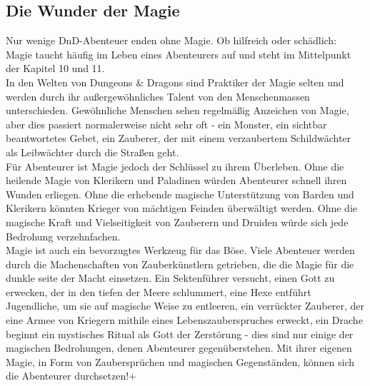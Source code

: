 \subsection{Die Wunder der Magie}
Nur wenige DnD-Abenteuer enden ohne Magie. Ob hilfreich oder schädlich: Magie taucht häufig im Leben eines Abenteurers auf und steht im Mittelpunkt der Kapitel 10 und 11.\\
In den Welten von Dungeons & Dragons sind Praktiker der Magie selten und werden durch ihr außergewöhnliches Talent von den Menschenmassen unterschieden. Gewöhnliche Menschen sehen regelmäßig Anzeichen von Magie, aber dies passiert normalerweise nicht sehr oft - ein Monster, ein sichtbar beantwortetes Gebet, ein Zauberer, der mit einem verzaubertem Schildwächter als Leibwächter durch die Straßen geht.\\
Für Abenteurer ist Magie jedoch der Schlüssel zu ihrem Überleben. Ohne die heilende Magie von Klerikern und Paladinen würden Abenteurer schnell ihren Wunden erliegen. Ohne die erhebende magische Unterstützung von Barden und Klerikern könnten Krieger von mächtigen Feinden überwältigt werden. Ohne die magische Kraft und Vielseitigkeit von Zauberern und Druiden würde sich jede Bedrohung verzehnfachen.\\
Magie ist auch ein bevorzugtes Werkzeug für das Böse. Viele Abenteuer werden durch die Machenschaften von Zauberkünstlern getrieben, die die Magie für die dunkle seite der Macht einsetzen. Ein Sektenführer versucht, einen Gott zu erwecken, der in den tiefen der Meere schlummert, eine Hexe entführt Jugendliche, um sie auf magische Weise zu entleeren, ein verrückter Zauberer, der eine Armee von Kriegern mithile eines Lebenszauberspruches erweckt, ein Drache beginnt ein mystisches Ritual als Gott der Zerstörung - dies sind nur einige der magischen Bedrohungen, denen Abenteurer gegenüberstehen. Mit ihrer eigenen Magie, in Form von Zaubersprüchen und magischen Gegenständen, können sich die Abenteurer durchsetzen!+
